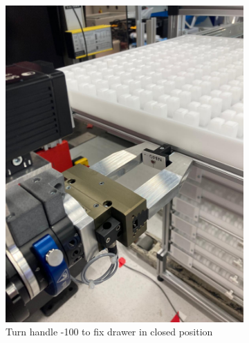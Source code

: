 \begin{figure}[!ht]
\begin{subfigure}[b]{0.32\textwidth}
        \includegraphics[width=\textwidth]{figures/shelf-control/close-handle.jpeg}
        \caption{Turn handle -100\textdegree{} to fix drawer in closed position}
        \label{fig:close-handle}
    \end{subfigure}\hspace{0.1cm}
    \begin{subfigure}[b]{0.32\textwidth}
        \centering

\end{subfigure}
\end{figure}
